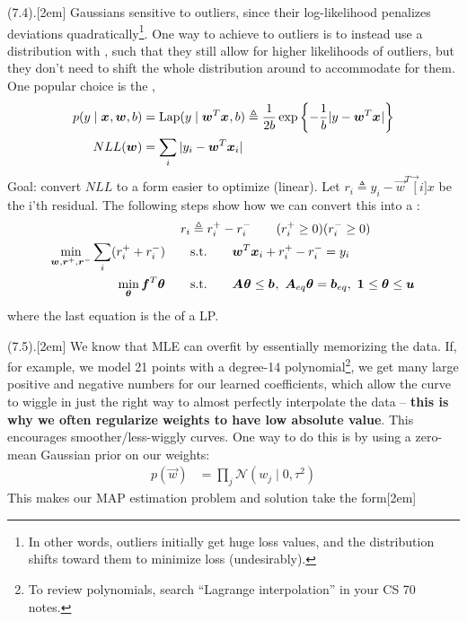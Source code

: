 \documentclass[11pt]{article}
\begin{document}
\myspace
\p {} (7.4).[2em] Gaussians sensitive to outliers, since their log-likelihood penalizes deviations quadratically\footnote{In other words, outliers initially get huge loss values, and the distribution shifts toward them to minimize loss (undesirably).}. One way to achieve  to outliers is to instead use a distribution with , such that they still allow for higher likelihoods of outliers, but they don't need to shift the whole distribution around to accommodate for them. One popular choice is the ,
\begin{align}
	p(y \mid \vec x , \vec w, b)
		&= \text{Lap}(y \mid \vec{w}^T \vec x, b)
		\triangleq \inv{2b} \exp\left\{ - \inv{b} | y - \vec{w}^T\vec x  | \right\} \\
	NLL(\vec w)
		&= \sum_i | y_i - \vec{w}^T \vec[i]{x} |
\end{align}
Goal: convert $NLL$ to a form easier to optimize (linear). Let $r_i \triangleq y_i - \vec{w}^T \vec[i]{x}$ be the i'th residual. The following steps show how we can convert this into a :
\begin{align}
	r_i
		&\triangleq r_i^+ - r_i^- \qquad (r_i^+ \ge 0)(r_i^- \ge 0)     \\
	\min_{\vec w, \vec{r}^+, \vec{r}^-} \sum_i (r_i^+ + r_i^-)
	\qquad&\text{s.t.}\qquad \vec{w}^T\vec[i]{x} + r_i^+ - r_i^- = y_i \\
	\min_{\vec\theta} \vec{f}^T \vec{\theta}
	\qquad&\text{s.t.}\qquad \matr A \vec{\theta} \le \vec b, ~ \matr[eq]{A}\vec{\theta} = \vec[eq]{b}, ~ \vec 1 \le \vec\theta \le \vec u
\end{align}
where the last equation is the  of a LP. 

\myspace 
\p {} (7.5).[2em] We know that MLE can overfit by essentially memorizing the data. If, for example, we model 21 points with a degree-14 polynomial\footnote{To review polynomials, search ``Lagrange interpolation'' in your CS 70 notes.}, we get many large positive and negative numbers for our learned coefficients, which allow the curve to wiggle in just the right way to almost perfectly interpolate the data -- \textbf{this is why we often regularize weights to have low absolute value}. This encourages smoother/less-wiggly curves. One way to do this is by using a zero-mean Gaussian prior on our weights:
\begin{align}
	p(\vec w)
		&= \prod_j \mathcal{N}(w_j \mid 0, \tau^2)
\end{align}
This makes our MAP estimation problem and solution take the form[2em]
\end{document}
